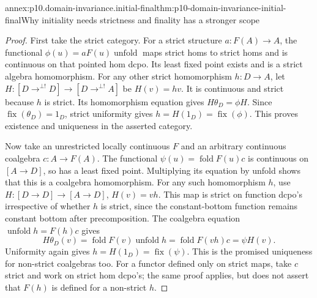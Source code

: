 \begin{annexitem}{annex:p10.domain-invariance.initial-final}{thm:p10-domain-invariance-initial-final}{Why initiality needs strictness and finality has a stronger scope}
\begin{proof}
First take the strict category. For a strict structure
\(a:F(A)\to A\), the functional
\(\phi(u)=aF(u)\operatorname{unfold}\) maps strict homs to
strict homs and is continuous on that pointed hom dcpo.
Its least fixed point exists and is a strict algebra homomorphism.
For any other strict homomorphism \(h:D\to A\), let
\(H:[D\mathrel{\mathop{\longrightarrow}^{\bot!}}D]\to
[D\mathrel{\mathop{\longrightarrow}^{\bot!}}A]\) be \(H(v)=hv\).
It is continuous and strict because \(h\) is strict. Its
homomorphism equation gives \(H\theta_D=\phi H\).
Since \(\operatorname{fix}(\theta_D)=1_D\), strict uniformity
gives \(h=H(1_D)=\operatorname{fix}(\phi)\).
This proves existence and uniqueness in the asserted category.

Now take an unrestricted locally continuous \(F\) and an
arbitrary continuous coalgebra \(c:A\to F(A)\). The functional
\(\psi(u)=\operatorname{fold}F(u)c\) is continuous on
\([A\longrightarrow D]\), so has a least fixed point.
Multiplying its equation by unfold shows that this is a coalgebra
homomorphism. For any such homomorphism \(h\), use
\(H:[D\longrightarrow D]\to[A\longrightarrow D]\),
\(H(v)=vh\). This map is strict on function dcpo's irrespective
of whether \(h\) is strict, since the constant-bottom function
remains constant bottom after precomposition. The coalgebra
equation \(\operatorname{unfold}h=F(h)c\) gives
\[
 H\theta_D(v)=\operatorname{fold}F(v)\operatorname{unfold}h
            =\operatorname{fold}F(vh)c=\psi H(v).
\]
Uniformity again gives \(h=H(1_D)=\operatorname{fix}(\psi)\).
This is the promised uniqueness for non-strict coalgebras too.
For a functor defined only on strict maps, take \(c\) strict
and work on strict hom dcpo's; the same proof applies, but does
not assert that \(F(h)\) is defined for a non-strict \(h\).
\end{proof}
\end{annexitem}

